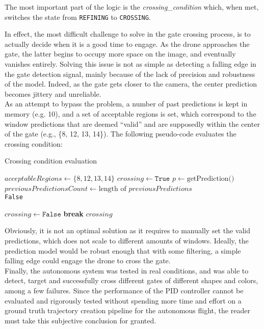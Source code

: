 The most important part of the logic is the \emph{crossing\_condition} which,
when met, switches the state from \texttt{REFINING} to \texttt{CROSSING}.

In effect, the most difficult challenge to solve in the gate crossing process,
is to actually decide when it is a good time to engage. As the drone
approaches the gate, the latter begins to occupy more space on the image, and
eventually vanishes entirely. Solving this issue is not as simple as detecting
a falling edge in the gate detection signal, mainly because of the lack of
precision and robustness of the model. Indeed, as the gate gets closer to the
camera, the center prediction becomes jittery and unreliable.\\

As an attempt to bypass the problem, a number of past predictions is kept in
memory (e.g. 10), and a set of acceptable regions is set, which correspond to
the window predictions that are deemed ``valid'' and are supposedly within the
center of the gate (e.g., \{8, 12, 13, 14\}). The following pseudo-code evaluates
the crossing condition:

\makeatletter
\def\BState{\State\hskip-\ALG@thistlm}
\makeatother

\begin{algorithm}
	\caption{Crossing condition evaluation}\label{alg:crosscond}
	\begin{algorithmic}[1]
			\State $\textit{acceptableRegions} \gets \{8, 12, 13, 14\}$
			\State $crossing \gets \texttt{True}$
			\State $p \gets \text{getPrediction()}$
			\State $previousPredictionsCount \gets \text{length of }
				\textit{previousPredictions}$
			~\\
				\Return \texttt{False}
			\EndIf

					\State $crossing \gets \texttt{False}$
					\State \textbf{break}
				\EndIf
			\EndFor
			\Return $\textit{crossing}$
		\EndFunction
	\end{algorithmic}
\end{algorithm}

Obviously, it is not an optimal solution as it requires to manually set the
valid predictions, which does not scale to different amounts of windows.
Ideally, the prediction model would be robust enough that with some filtering,
a simple falling edge could engage the drone to cross the gate.\\

Finally, the autonomous system was tested in real conditions, and was
able to detect, target and successfully cross different gates of different
shapes and colors, among a few failures. Since the performance of the PID
controller cannot be evaluated and rigorously tested without spending more time
and effort on a ground truth trajectory creation pipeline for the autonomous
flight, the reader must take this subjective conclusion for granted.
